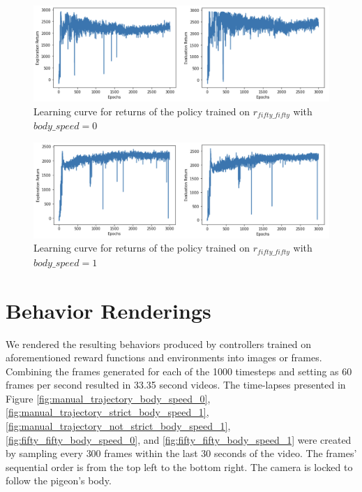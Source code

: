   \begin{figure}[H]
      \centering
      \includegraphics[width=1\textwidth]{figures/learning_curves/fifty_fifty_bs_0.png}
      \caption{Learning curve for returns of the policy trained on $r_{fifty\_fifty}$ with $body\_speed = 0$}
      \label{fig:learning_rate_fifty_fifty_bs_0}
  \end{figure}

  \begin{figure}[H]
      \centering
      \includegraphics[width=1\textwidth]{figures/learning_curves/fifty_fifty_bs_1.png}
      \caption{Learning curve for returns of the policy trained on $r_{fifty\_fifty}$ with $body\_speed = 1$}
      \label{fig:learning_rate_fifty_fifty_bs_1}
  \end{figure}



\section{Behavior Renderings}
  We rendered the resulting behaviors produced by controllers trained on aforementioned reward functions and environments into images or frames.
  Combining the frames generated for each of the 1000 timesteps and setting as 60 frames per second resulted in 33.35 second videos.
  The time-lapses presented in Figure \ref{fig:manual_trajectory_body_speed_0}, \ref{fig:manual_trajectory_strict_body_speed_1}, \ref{fig:manual_trajectory_not_strict_body_speed_1}, \ref{fig:fifty_fifty_body_speed_0}, and \ref{fig:fifty_fifty_body_speed_1} were created by sampling every $300$ frames within the last 30 seconds of the video.
  The frames' sequential order is from the top left to the bottom right.
  The camera is locked to follow the pigeon's body.

